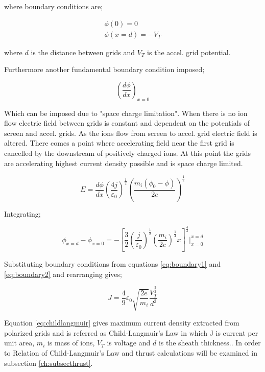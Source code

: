 where boundary conditions are\cite{OCW1964};

\begin{equation}
    \begin{aligned}
        \phi(0) = 0 \\
        \phi(x=d) = -V_T
    \end{aligned}
    \label{eq:boundary1}
\end{equation}

where $d$ is the distance between grids and $V_T$ is the accel. grid potential. 

Furthermore another fundamental boundary condition imposed\cite{OCW1964};

\begin{equation}
    \left(\frac{d\phi}{dx}\right)_{x=0}
    \label{eq:boundary2}
\end{equation}

Which can be imposed due to "space charge limitation". When there is no ion flow electric field between grids is constant and dependent on the potentials of screen and accel. grids. As the ions flow from screen to accel. grid electric field is altered. There comes a point where accelerating field near the first grid is cancelled by the downstream of positively charged ions. At this point the grids are accelerating highest current density possible and is space charge limited\cite{lara2016design}. 

\begin{equation}
    E = \frac{d\phi}{dx} \left(\frac{4j}{\varepsilon_0}\right)^{\frac{1}{2}}\left(\frac{m_i (\phi_0 - \phi)}{2e}\right)^{\frac{1}{2}}
\end{equation}

Integrating;

\begin{equation}
    \phi_{x=d} - \phi_{x=0} = - \left[\frac{3}{2}\left(\frac{j}{\varepsilon_0}\right)^{\frac{1}{2}}\left(\frac{m_i}{2e}\right)^{\frac{1}{4}}x\right]^{\frac{4}{3}}\bigg| ^{x=d}_{x=0}
\end{equation}

Substituting boundary conditions from equations \ref{eq:boundary1} and \ref{eq:boundary2} and rearranging gives;

\begin{equation}
    J = \frac{4}{9}\varepsilon_0 \sqrt{\frac{2e}{m_i}}\frac{V_T^{\frac{3}{2}}}{d^2}
    \label{eq:childlangmuir}
\end{equation}

Equation \ref{eq:childlangmuir} gives maximum current density extracted from polarized grids and is referred as Child-Langmuir's Law in which J is current per unit area, $m_i$ is mass of ions, $V_T$ is voltage and $d$ is the sheath thickness.. In order to Relation of Child-Langmuir's Law and thrust calculations will be examined in subsection \ref{ch:subsecthrust}.

